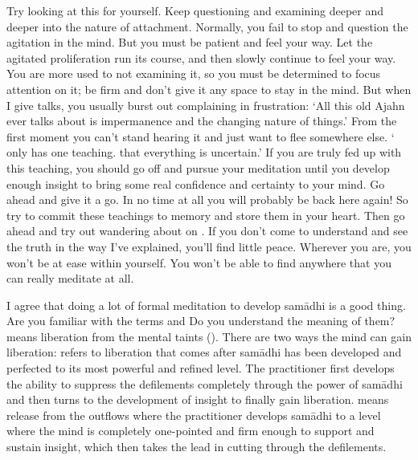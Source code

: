 Try looking at this for yourself. Keep questioning and examining deeper and deeper into the nature of attachment. Normally, you fail to stop and question the agitation in the mind. But you must be patient and feel your way. Let the agitated proliferation run its course, and then slowly continue to feel your way. You are more used to not examining it, so you must be determined to focus attention on it; be firm and don't give it any space to stay in the mind. But when I give talks, you usually burst out complaining in frustration: `All this old Ajahn ever talks about is impermanence and the changing nature of things.' From the first moment you can't stand hearing it and just want to flee somewhere else. ` only has one teaching. that everything is uncertain.' If you are truly fed up with this teaching, you should go off and pursue your meditation until you develop enough insight to bring some real confidence and certainty to your mind. Go ahead and give it a go. In no time at all you will probably be back here again! So try to commit these teachings to memory and store them in your heart. Then go ahead and try out wandering about on . If you don't come to understand and see the truth in the way I've explained, you'll find little peace. Wherever you are, you won't be at ease within yourself. You won't be able to find anywhere that you can really meditate at all. 

I agree that doing a lot of formal meditation to develop sam\=adhi is a good thing. Are you familiar with the terms  and  Do you understand the meaning of them?  means liberation from the mental taints (). There are two ways the mind can gain liberation:  refers to liberation that comes after sam\=adhi has been developed and perfected to its most powerful and refined level. The practitioner first develops the ability to suppress the defilements completely through the power of sam\=adhi and then turns to the development of insight to finally gain liberation.  means release from the outflows where the practitioner develops sam\=adhi to a level where the mind is completely one-pointed and firm enough to support and sustain insight, which then takes the lead in cutting through the defilements. 

